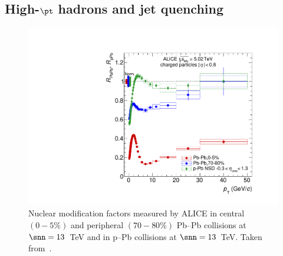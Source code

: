 \subsection{High-$\mathbf{\pt}$ hadrons and jet quenching}
\begin{figure}[htb]
  \centering
  \includegraphics[width=0.7\linewidth]{Figures/Chapter 1/rAArpPb.pdf}
  \caption{Nuclear modification factors measured by ALICE in central $(0-5\%)$ and peripheral $(70-80\%)$ Pb--Pb collisions at $\snn=13$~TeV and in p--Pb collisions at $\snn = 13$~TeV. Taken from~\cite{ALICE:2018vuu}.}
  \label{fig:RAA}
\end{figure}

